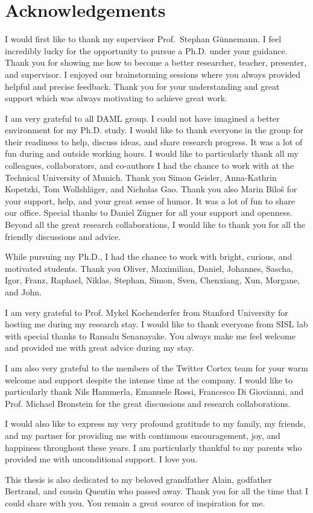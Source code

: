 \chapter*{Acknowledgements}
%



I would first like to thank my supervisor Prof.~Stephan Günnemann. I feel incredibly lucky for the opportunity to pursue a Ph.D. under your guidance. Thank you for showing me how to become a better researcher, teacher, presenter, and supervisor. I enjoyed our brainstorming sessions where you always provided helpful and precise feedback. Thank you for your understanding and great support which was always motivating to achieve great work.

I am very grateful to all DAML group. I could not have imagined a better environment for my Ph.D. study. I would like to thank everyone in the group for their readiness to help, discuss ideas, and share research progress. It was a lot of fun during and outside working hours. I would like to particularly thank all my colleagues, collaborators, and co-authors I had the chance to work with at the Technical University of Munich. Thank you Simon Geisler, Anna-Kathrin Kopetzki, Tom Wollshläger, and Nicholas Gao. Thank you also Marin Biloš for your support, help, and your great sense of humor. It was a lot of fun to share our office. Special thanks to Daniel Zügner for all your support and openness. Beyond all the great research collaborations, I would like to thank you for all the friendly discussions and advice.

While pursuing my Ph.D., I had the chance to work with bright, curious, and motivated students. Thank you Oliver, Maximilian, Daniel, Johannes, Sascha, Igor, Franz, Raphael, Niklas, Stephan, Simon, Sven, Chenxiang, Xun, Morgane, and John.

I am very grateful to Prof. Mykel Kochenderfer from Stanford University for hosting me during my research stay. I would like to thank everyone from SISL lab with special thanks to Ransalu Senanayake. You always make me feel welcome and provided me with great advice during my stay.

I am also very grateful to the members of the Twitter Cortex team for your warm welcome and support despite the intense time at the company. I would like to particularly thank Nils Hammerla, Emanuele Rossi, Francesco Di Giovianni, and Prof. Michael Bronstein for the great discussions and research collaborations.

I would also like to express my very profound gratitude to my family, my friends, and my partner for providing me with continuous encouragement, joy, and happiness throughout these years. I am particularly thankful to my parents who provided me with unconditional support. I love you.

This thesis is also dedicated to my beloved grandfather Alain, godfather Bertrand, and cousin Quentin who passed away. Thank you for all the time that I could share with you. You remain a great source of inspiration for me.
